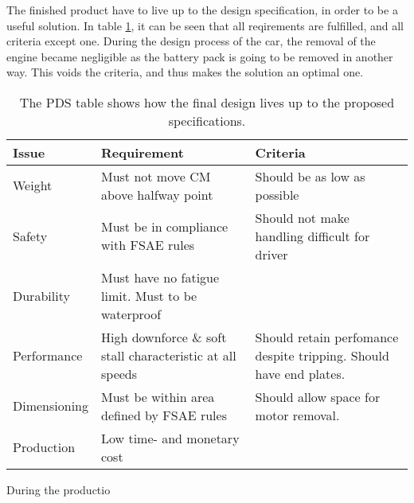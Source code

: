   The finished product have to live up to the design specification, in order to be a useful solution. In table \ref{tab:designreview}, it can be seen that all reqirements are fulfilled, and all criteria except one. During the design process of the car, the removal of the engine became negligible as the battery pack is going to be removed in another way. This voids the criteria, and thus makes the solution an optimal one.

  \begin{table}
    \begin{tabularx}{\textwidth}[t]{>{\columncolor{seapurple!40}}l XX}
      \arrayrulecolor{seapurple}\hline
      \rowcolor{white}
      \textbf{\textcolor{seapurple}{Issue}} & \textbf{\textcolor{seapurple}{Requirement}} & \textbf{\textcolor{seapurple}{Criteria}}\\
      \hline
      Weight & \cellcolor{seagreen!40}Must not move CM above halfway point & \cellcolor{seagreen!40}Should be as low as possible \\
      Safety & \cellcolor{seagreen!40}Must be in compliance with FSAE rules & \cellcolor{seagreen!40}Should not make handling difficult for driver\\
      Durability & \cellcolor{seagreen!40} Must have no fatigue limit. Must to be waterproof \\
      Performance & \cellcolor{seagreen!40} High downforce \& soft stall characteristic at all speeds &\cellcolor{seagreen!40} Should retain perfomance despite tripping. Should have end plates.\\
      Dimensioning & \cellcolor{seagreen!40} Must be within area defined by FSAE rules & \cellcolor{seayellow!40} Should allow space for motor removal. \\
      Production & \cellcolor{seagreen!40} Low time- and monetary cost
      \label{tab:designreview}
    \end{tabularx}
    \caption{The PDS table shows how the final design lives up to the proposed specifications.}
  \end{table}

  During the productio
